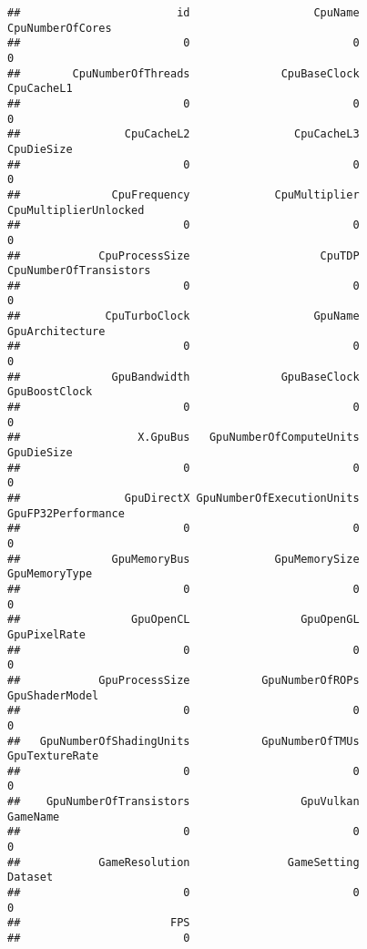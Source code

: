 \documentclass[
]{article}
\begin{document}
\begin{verbatim}
##                        id                   CpuName          CpuNumberOfCores 
##                         0                         0                         0 
##        CpuNumberOfThreads              CpuBaseClock                CpuCacheL1 
##                         0                         0                         0 
##                CpuCacheL2                CpuCacheL3                CpuDieSize 
##                         0                         0                         0 
##              CpuFrequency             CpuMultiplier     CpuMultiplierUnlocked 
##                         0                         0                         0 
##            CpuProcessSize                    CpuTDP    CpuNumberOfTransistors 
##                         0                         0                         0 
##             CpuTurboClock                   GpuName           GpuArchitecture 
##                         0                         0                         0 
##              GpuBandwidth              GpuBaseClock             GpuBoostClock 
##                         0                         0                         0 
##                  X.GpuBus   GpuNumberOfComputeUnits                GpuDieSize 
##                         0                         0                         0 
##                GpuDirectX GpuNumberOfExecutionUnits        GpuFP32Performance 
##                         0                         0                         0 
##              GpuMemoryBus             GpuMemorySize             GpuMemoryType 
##                         0                         0                         0 
##                 GpuOpenCL                 GpuOpenGL              GpuPixelRate 
##                         0                         0                         0 
##            GpuProcessSize           GpuNumberOfROPs            GpuShaderModel 
##                         0                         0                         0 
##   GpuNumberOfShadingUnits           GpuNumberOfTMUs            GpuTextureRate 
##                         0                         0                         0 
##    GpuNumberOfTransistors                 GpuVulkan                  GameName 
##                         0                         0                         0 
##            GameResolution               GameSetting                   Dataset 
##                         0                         0                         0 
##                       FPS 
##                         0
\end{verbatim}
\end{document}
